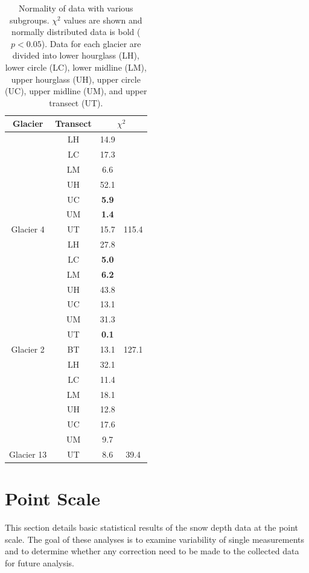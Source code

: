 \documentclass{sfuthesis}
\newcommand{\transectAbb}{Data for each glacier are divided into lower hourglass (LH), lower circle (LC), lower midline (LM), upper hourglass (UH), upper circle (UC), upper midline (UM), and upper transect (UT).}
\begin{document}
\begin{appendices}
\begin{table}
\centering
\caption[]{Normality of data with various subgroups. $\chi^2$ values are shown and normally distributed data is bold ($p<0.05$). \transectAbb}
\label{tab:normality}
\begin{tabular}{cccc}
\textbf{Glacier} & \textbf{Transect} & \multicolumn{2}{c}{\textbf{$\chi^2$}} \\ 
\hline
\hline 
& LH & 14.9 &   \\
  & LC & 17.3 &   \\
  & LM & 6.6 &   \\
  & UH & 52.1 &   \\
  & UC & \textbf{5.9} &   \\
& UM & \textbf{1.4} &   \\
\multirow{-7}{*}{Glacier 4} & UT & 15.7 & \multirow{-7}{*}{ 115.4} \\ \hline
 & LH & 27.8 &  \\
 & LC & \textbf{5.0} &  \\
 & LM & \textbf{6.2} &  \\
 & UH & 43.8 &  \\
 & UC & 13.1 &  \\
 & UM & 31.3 &  \\
 & UT & \textbf{0.1} &  \\
\multirow{-8}{*}{Glacier 2} & BT & 13.1 & \multirow{-8}{*}{127.1} \\ \hline
  
  & LH & 32.1 &   \\ 
  
  & LC & 11.4 &   \\
  
  & LM & 18.1 &   \\
  
  & UH & 12.8 &   \\
  
  & UC & 17.6 &   \\
  
  & UM & 9.7 &   \\
  
\multirow{-7}{*}{ Glacier 13} & UT & 8.6 & \multirow{-7}{*}{ 39.4}
\end{tabular}
\end{table}

\section{Point Scale}

This section details basic statistical results of the snow depth data at the point scale. The goal of these analyses is to examine variability of single measurements and to determine whether any correction need to be made to the collected data for future analysis. 


\end{appendices}
\end{document}
